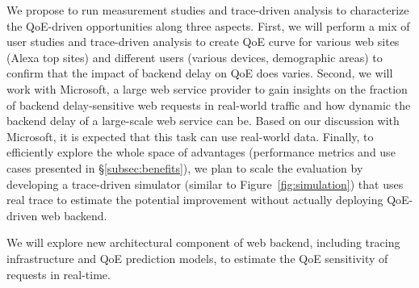 We propose to run measurement studies and trace-driven analysis to characterize the QoE-driven opportunities along three aspects.
First, we will perform a mix of user studies and trace-driven analysis to create QoE curve for various web sites (\eg Alexa top sites) and different users (\eg various devices, demographic areas) to confirm that the impact of backend delay on QoE does varies.
Second, we will work with Microsoft, a large web service provider to gain insights on the fraction of backend delay-sensitive web requests in real-world traffic and how dynamic the backend delay of a large-scale web service can be.
Based on our discussion with Microsoft, it is expected that this task can use real-world data.
Finally, to efficiently explore the whole space of advantages (performance metrics and use cases presented in \S\ref{subsec:benefits}), we plan to scale the evaluation by developing a trace-driven simulator (similar to Figure~\ref{fig:simulation}) that uses real trace to estimate the potential improvement without actually deploying QoE-driven web backend.






\label{sec:enabler}
\begin{task}
We will explore new architectural component of web backend, including tracing infrastructure and QoE prediction models, to estimate the QoE sensitivity of requests in real-time.
\end{task}


